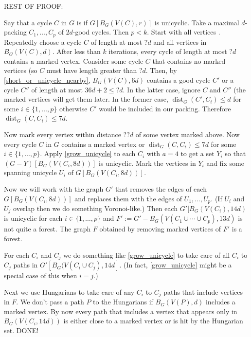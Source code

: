\documentclass{patmorin}
\DeclareMathOperator{\dist}{dist}
\begin{document}
REST OF PROOF:

Say that a cycle $C$ in $G$ is  if $G[B_G(V(C),r)]$ is unicyclic.  Take a maximal $d$-packing $C_1,\ldots,C_p$ of $2d$-good cycles.  Then $p< k$. Start with all vertices .  Repeatedly choose a cycle $C$ of length at most $?d$ and  all vertices in $B_G(V(C),d)$.  After less than $k$ iterations, every cycle of length at most $?d$ contains a marked vertex.  Consider some cycle $C$ that contains no marked vertices (so $C$ must have length greater than $?d$.  Then, by \cref{short_or_unicycle_nearby}, $B_G(V(C),6d)$ contains a good cycle $C'$ or a cycle $C''$ of length at most $36d+2\le ?d$.  In the latter case, ignore $C$ and $C''$ (the marked vertices will get them later.  In the former case, $\dist_G(C',C_i)\le d$ for some $i\in\{1,\ldots,p\}$ otherwise $C'$ would be included in our packing.  Therefore $\dist_G(C,C_i)\le 7d$.  

Now mark every vertex within distance $??d$ of some vertex marked above.  Now every cycle $C$ in $G$ contains a marked vertex or $\dist_G(C,C_i)\le 7d$ for some $i\in\{1,\ldots,p\}$.  Apply \cref{grow_unicycle} to each $C_i$ with $a=4$ to get a set $Y_i$ so that $(G-Y)[B_G(V(C_i,8d))]$ is unicyclic.  Mark the vertices in $Y_i$ and fix some spanning unicycle $U_i$ of $G[B_G(V(C_i,8d))]$.

Now we will work with the graph $G'$ that removes the edges of each $G[B_G(V(C_i,8d))]$ and replaces them with the edges of $U_1,\ldots,U_p$.  (If $U_i$ and $U_j$ overlap then we do something Voronoi-like.)  Then each $G'[B_G(V(C_i),14d)$ is unicyclic for each $i\in\{1,\ldots,p\}$ and $F':=G'-B_G(V(C_1\cup\cdots\cup C_p),13d)$ is not quite a forest. The graph $F$ obtained by removing marked vertices of $F'$ is a forest. 

For each $C_i$ and $C_j$ we do something like \cref{grow_unicycle} to take care of all $C_i$ to $C_j$ paths in $G'[B_G(V(C_i\cup C_j),14d]$.  (In fact, \cref{grow_unicycle} might be a special case of this when $i=j$.)

Next we use Hungarians to take care of any $C_i$ to $C_j$ paths that include vertices in $F$. We don't pass a path $P$ to the Hungarians if $B_G(V(P),d)$ includes a marked vertex.  By now every path that includes a vertex that appears only in $B_G(V(C_i,14d))$ is either close to a marked vertex or is hit by the Hungarian set. DONE!
\end{document}
